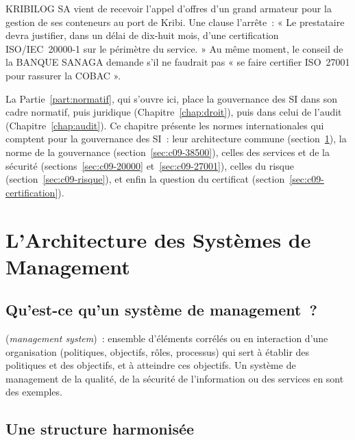 KRIBILOG SA vient de recevoir l'appel d'offres d'un grand armateur pour
la gestion de ses conteneurs au port de Kribi. Une clause l'arrête~: « Le
prestataire devra justifier, dans un délai de dix-huit mois, d'une
certification ISO/IEC~20000-1 sur le périmètre du service. » Au même
moment, le conseil de la BANQUE SANAGA demande s'il ne faudrait pas
« se faire certifier ISO~27001 pour rassurer la COBAC ».

La Partie~\ref{part:normatif}, qui s'ouvre ici, place la gouvernance des SI
dans son cadre normatif, puis juridique (Chapitre~\ref{chap:droit}), puis
dans celui de l'audit (Chapitre~\ref{chap:audit}). Ce chapitre présente les
normes internationales qui comptent pour la gouvernance des SI~: leur
architecture commune (section~\ref{sec:c09-structure}), la norme de la
gouvernance (section~\ref{sec:c09-38500}), celles des services et de la
sécurité (sections~\ref{sec:c09-20000} et~\ref{sec:c09-27001}), celles du
risque (section~\ref{sec:c09-risque}), et enfin la question du certificat
(section~\ref{sec:c09-certification}).

\separateur

\section{L'Architecture des Systèmes de Management}
\label{sec:c09-structure}

\subsection{Qu'est-ce qu'un système de management~?}

\begin{boxdef}
(\textit{management system})~: ensemble d'éléments corrélés ou en
interaction d'une organisation (politiques, objectifs, rôles, processus)
qui sert à établir des politiques et des objectifs, et à atteindre ces
objectifs. Un système de management de la qualité, de la sécurité de
l'information ou des services en sont des exemples.
\end{boxdef}

\subsection{Une structure harmonisée}


